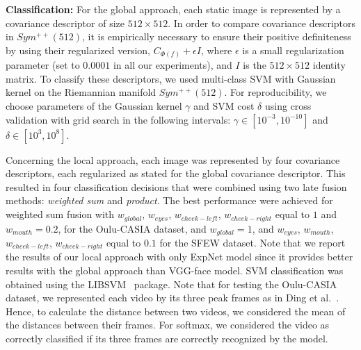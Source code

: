 \documentclass{bmvc2k}
\begin{document}
\textbf{Classification:}
For the global approach, each static image is represented by a covariance descriptor of size $512 \times 512$. In order to compare covariance descriptors in $Sym^{++}(512)$, it is empirically necessary to ensure their positive definiteness by using their regularized version, $C_{\Phi(f)} + \epsilon I$, where $\epsilon$ is a small regularization parameter (set to $0.0001$ in all our experiments), and $I$ is the $512 \times 512$ identity matrix.
To classify these descriptors, we used multi-class SVM with Gaussian kernel on the Riemannian manifold $Sym^{++}(512)$.
For reproducibility, we choose parameters of the Gaussian kernel $\gamma$ and SVM cost $\delta$ using cross validation with grid search in the following intervals: $\gamma \in [10^{-3}, 10^{-10}]$ and $\delta \in [10^{3}, 10^{8}]$.

Concerning the local approach, each image was represented by four covariance descriptors, each  regularized as stated for the global covariance descriptor. This resulted in four classification decisions that were combined using two late fusion methods: \textit{weighted sum} and \textit{product}. The best performance were achieved for weighted sum fusion with $w_{global}$, $w_{eyes}$, $w_{cheek-left}$, $w_{cheek-right}$ equal to $1$ and $w_{mouth}=0.2$, for the Oulu-CASIA dataset, and $w_{global}=1$, and $w_{eyes}$, $w_{mouth}$, $w_{cheek-left}$, $w_{cheek-right}$ equal to $0.1$ for the SFEW dataset. Note that we report the results of our local approach with only ExpNet model since it provides better results with the global approach than VGG-face model. SVM classification was obtained using the LIBSVM~\cite{chang2001libsvm} package.
Note that for testing the Oulu-CASIA dataset, we represented each video by its three peak frames as in Ding et al.~\cite{ding2017facenet2expnet}. Hence, to calculate the distance between two videos, we considered the mean of the distances between their frames. For softmax, we considered the video as correctly classified if its three frames are correctly recognized by the model.
\end{document}
